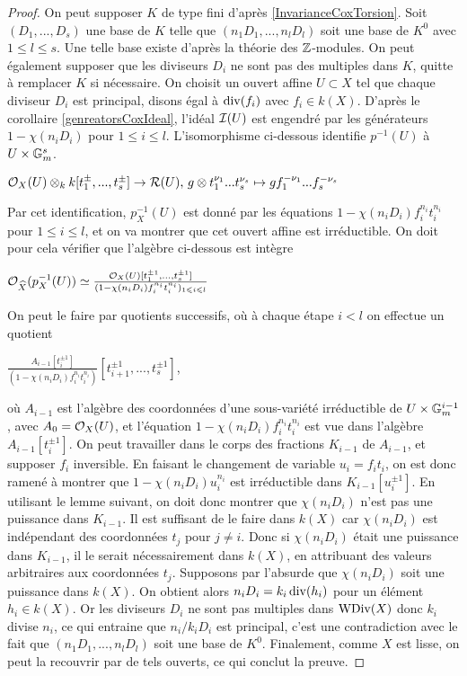 \begin{proof}
On peut supposer $K$ de type fini d'après \ref{InvarianceCoxTorsion}. Soit $(D_1,...,D_s)$ une base de $K$ telle que $(n_1D_1,...,n_lD_l)$ soit une base de $K^0$ avec $1\leq l\leq s$. Une telle base existe d'après la théorie des $\mathbb{Z}$-modules. On peut également supposer que les diviseurs $D_i$ ne sont pas des multiples dans $K$, quitte à remplacer $K$ si nécessaire. On choisit un ouvert affine $U\subset X$ tel que chaque diviseur $D_i$ est principal, disons égal à $\operatorname{div}(f_i)$ avec $f_i\in k(X)$. D'après le corollaire \ref{genreatorsCoxIdeal}, l'idéal $\mathcal{I}(U)$ est engendré par les générateurs $1-\chi(n_iD_i)$ pour $1\leq i\leq l$. L'isomorphisme ci-dessous identifie $p^{-1}(U)$ à $U\times \mathbb{G}_m^s$. 
\begin{center}
$\mathcal{O}_X(U)\otimes_k k[t_1^{\pm},...,t_s^{\pm}] \rightarrow \mathcal{R}(U),\, g\otimes t_1^{\nu_1}...t_s^{\nu_s}\mapsto gf_1^{-\nu_1}...f_s^{-\nu_s}$
\end{center}
Par cet identification, $p_X^{-1}(U)$ est donné par les équations $1-\chi(n_iD_i)f_i^{n_i}t_i^{n_i}$ pour $1\leq i\leq l$, et on va montrer que cet ouvert affine est irréductible. On doit pour cela vérifier que l'algèbre ci-dessous est intègre
\begin{center}
$\mathcal{O}_{\widehat{X}}(p_X^{-1}(U))\simeq \frac{\mathcal{O}_X(U)[t_1^{\pm 1},...,t_s^{\pm 1}]}{(1-\chi(n_iD_i)f_i^{n_i}t_i^{n_i})_{1\leqslant i\leqslant l}}$
\end{center}
On peut le faire par quotients successifs, où à chaque étape $i<l$ on effectue un quotient
\begin{center}
$\frac{A_{i-1}[t_i^{\pm 1}]}{(1-\chi(n_iD_i)f_i^{n_i}t_i^{n_i})}[t_{i+1}^{\pm 1},...,t_s^{\pm 1}]$,
\end{center}
où $A_{i-1}$ est l'algèbre des coordonnées d'une sous-variété irréductible de $U\times\mathbb{G}_m^{i-1}$, avec $A_0=\mathcal{O}_X(U)$, et l'équation $1-\chi(n_iD_i)f_i^{n_i}t_i^{n_i}$ est vue dans l'algèbre $A_{i-1}[t_i^{\pm 1}]$. On peut travailler dans le corps des fractions $K_{i-1}$ de $A_{i-1}$, et supposer $f_i$ inversible. En faisant le changement de variable $u_i=f_it_i$, on est donc ramené à montrer que $1-\chi(n_iD_i)u_i^{n_i}$ est irréductible dans $K_{i-1}[u_i^{\pm 1}]$. En utilisant le lemme suivant, on doit donc montrer que $\chi(n_iD_i)$ n'est pas une puissance dans $K_{i-1}$. Il est suffisant de le faire dans $k(X)$ car $\chi(n_iD_i)$ est indépendant des coordonnées $t_j$ pour $j\neq i$. Donc si $\chi(n_iD_i)$ était une puissance dans $K_{i-1}$, il le serait nécessairement dans $k(X)$, en attribuant des valeurs arbitraires aux coordonnées $t_j$. Supposons par l'absurde que $\chi(n_iD_i)$ soit une puissance dans $k(X)$. On obtient alors $n_iD_i=k_i\operatorname{div}(h_i)$ pour un élément $h_i\in k(X)$. Or les diviseurs $D_i$ ne sont pas multiples dans $\operatorname{WDiv}(X)$ donc $k_i$ divise $n_i$, ce qui entraine que $n_i/k_iD_i$ est principal, c'est une contradiction avec le fait que $(n_1D_1,...,n_lD_l)$ soit une base de $K^0$. Finalement, comme $X$ est lisse, on peut la recouvrir par de tels ouverts, ce qui conclut la preuve.
\end{proof}

